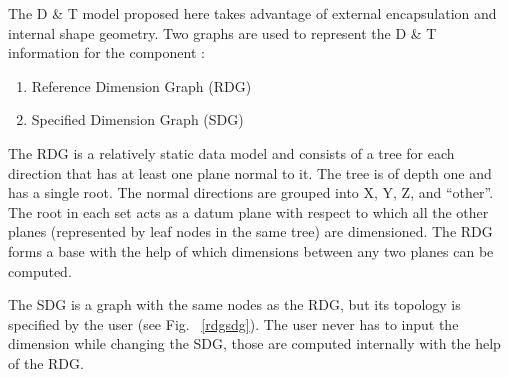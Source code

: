         The D \& T model proposed here takes advantage of external
        encapsulation and internal shape geometry. 
        Two graphs are used to represent the D \& T information for the 
		component :

		\begin{enumerate}
			\item
            Reference Dimension Graph (RDG)
			\item
            Specified Dimension Graph (SDG)

		\end{enumerate}

		The RDG is a relatively static data model and consists of a tree for
		each direction that has at least one plane normal to it. The tree is 
		of depth one and has a single root.
		The normal directions are grouped into X, Y, Z, and ``other''. The
		root in each set acts as a datum plane with respect to which all the
		other planes (represented by leaf nodes in the same tree) are
		dimensioned. The RDG forms a base with the help of which dimensions
		between any two planes can be computed.

		The SDG is a graph with the same nodes as the RDG, but its topology 
		is specified by the user (see Fig. ~\ref{rdgsdg}). The user never
		has to input the dimension while changing the SDG, those are
		computed internally with the help of the RDG.

